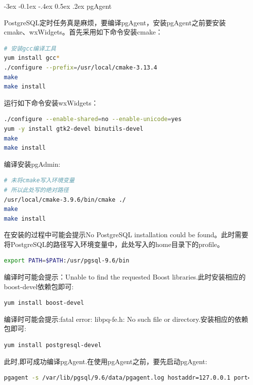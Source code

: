 \documentclass[8pt]{book}
\makeatletter
\numberwithin{dummy}{section}
\theoremstyle{ocrenumbox}
\theoremstyle{blacknumex}
\theoremstyle{blacknumbox}
\theoremstyle{ocrenum}
\renewcommand{\subsection}{\@startsection {subsection}{2}{\z@}
	{-3ex \@plus -0.1ex \@minus -.4ex}
	{0.5ex \@plus.2ex }
	{\normalfont\sffamily\bfseries}}
\makeatother
\begin{document}
\subsection{pgAgent}

PostgreSQL定时任务真是麻烦，要编译pgAgent，安装pgAgent之前要安装cmake、wxWidgets。首先采用如下命令安装cmake：

\begin{lstlisting}[language=Bash]
# 安装gcc编译工具
yum install gcc*
./configure --prefix=/usr/local/cmake-3.13.4
make
make install
\end{lstlisting}

运行如下命令安装wxWidgets：

\begin{lstlisting}[language=Bash]
./configure --enable-shared=no --enable-unicode=yes
yum -y install gtk2-devel binutils-devel
make
make install
\end{lstlisting}

编译安装pgAdmin:

\begin{lstlisting}[language=Bash]
# 未将cmake写入环境变量
# 所以此处写的绝对路径
/usr/local/cmake-3.9.6/bin/cmake ./
make
make install
\end{lstlisting}

在安装的过程中可能会提示No PostgreSQL installation could be found。此时需要将PostgreSQL的路径写入环境变量中，此处写入的home目录下的profile。

\begin{lstlisting}[language=Bash]
export PATH=$PATH:/usr/pgsql-9.6/bin
\end{lstlisting}

编译时可能会提示：Unable to find the requested Boost libraries.此时安装相应的boost-devel依赖包即可:

\begin{lstlisting}[language=Bash]
yum install boost-devel
\end{lstlisting}

编译时可能会提示:fatal error: libpq-fe.h: No such file or directory.安装相应的依赖包即可:

\begin{lstlisting}[language=Bash]
yum install postgresql-devel
\end{lstlisting}


此时,即可成功编译pgAgent.在使用pgAgent之前，要先启动pgAgent:

\begin{lstlisting}[language=Bash]
pgagent -s /var/lib/pgsql/9.6/data/pgagent.log hostaddr=127.0.0.1 port=5432 dbname=dolphin user=postgres password=postgres
\end{lstlisting}
\end{document}
